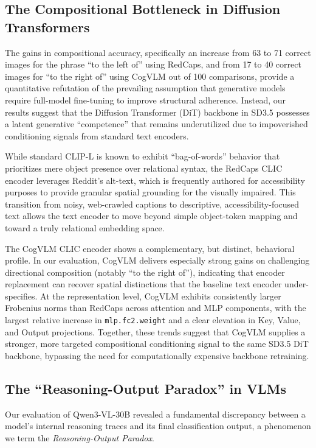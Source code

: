 \subsection{The Compositional Bottleneck in Diffusion Transformers}
The gains in compositional accuracy, specifically an increase from 63 to 71 correct images for the phrase ``to the left of'' using RedCaps, and from 17 to 40 correct images for ``to the right of'' using CogVLM out of 100 comparisons, provide a quantitative refutation of the prevailing assumption that generative models require full-model fine-tuning to improve structural adherence. Instead, our results suggest that the Diffusion Transformer (DiT) backbone in SD3.5 possesses a latent generative ``competence'' that remains underutilized due to impoverished conditioning signals from standard text encoders.

While standard CLIP-L is known to exhibit ``bag-of-words'' behavior that prioritizes mere object presence over relational syntax, the RedCaps CLIC encoder leverages Reddit’s alt-text, which is frequently authored for accessibility purposes to provide granular spatial grounding for the visually impaired. This transition from noisy, web-crawled captions to descriptive, accessibility-focused text allows the text encoder to move beyond simple object-token mapping and toward a truly relational embedding space.

The CogVLM CLIC encoder shows a complementary, but distinct, behavioral profile. In our evaluation, CogVLM delivers especially strong gains on challenging directional composition (notably ``to the right of''), indicating that encoder replacement can recover spatial distinctions that the baseline text encoder under-specifies. At the representation level, CogVLM exhibits consistently larger Frobenius norms than RedCaps across attention and MLP components, with the largest relative increase in \texttt{mlp.fc2.weight} and a clear elevation in Key, Value, and Output projections. Together, these trends suggest that CogVLM supplies a stronger, more targeted compositional conditioning signal to the same SD3.5 DiT backbone, bypassing the need for computationally expensive backbone retraining.

\subsection{The ``Reasoning-Output Paradox'' in VLMs}
Our evaluation of Qwen3-VL-30B revealed a fundamental discrepancy between a model's internal reasoning traces and its final classification output, a phenomenon we term the \textit{Reasoning-Output Paradox}.

